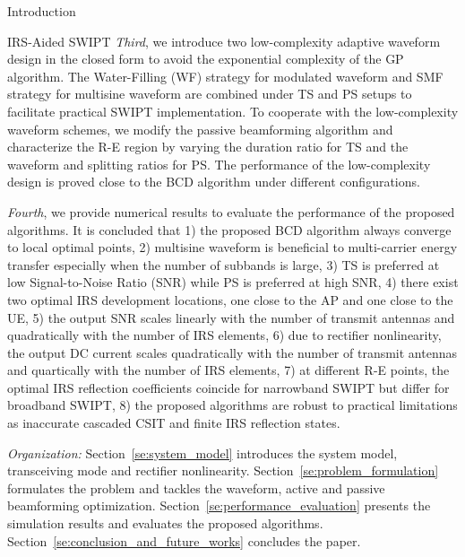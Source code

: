 \documentclass[journal]{IEEEtran}
\begin{document}
\begin{section}{Introduction}
\begin{subsection}{IRS-Aided SWIPT}
			\emph{Third}, we introduce two low-complexity adaptive waveform design in the closed form to avoid the exponential complexity of the GP algorithm. The Water-Filling (WF) strategy for modulated waveform and SMF strategy for multisine waveform are combined under TS and PS setups to facilitate practical SWIPT implementation. To cooperate with the low-complexity waveform schemes, we modify the passive beamforming algorithm and characterize the R-E region by varying the duration ratio for TS and the waveform and splitting ratios for PS. The performance of the low-complexity design is proved close to the BCD algorithm under different configurations.

			\emph{Fourth}, we provide numerical results to evaluate the performance of the proposed algorithms. It is concluded that 1) the proposed BCD algorithm always converge to local optimal points, 2) multisine waveform is beneficial to multi-carrier energy transfer especially when the number of subbands is large, 3) TS is preferred at low Signal-to-Noise Ratio (SNR) while PS is preferred at high SNR, 4) there exist two optimal IRS development locations, one close to the AP and one close to the UE, 5) the output SNR scales linearly with the number of transmit antennas and quadratically with the number of IRS elements, 6) due to rectifier nonlinearity, the output DC current scales quadratically with the number of transmit antennas and quartically with the number of IRS elements, 7) at different R-E points, the optimal IRS reflection coefficients coincide for narrowband SWIPT but differ for broadband SWIPT, 8) the proposed algorithms are robust to practical limitations as inaccurate cascaded CSIT and finite IRS reflection states.

			\emph{Organization:} Section~\ref{se:system_model} introduces the system model, transceiving mode and rectifier nonlinearity. Section~\ref{se:problem_formulation} formulates the problem and tackles the waveform, active and passive beamforming optimization. Section~\ref{se:performance_evaluation} presents the simulation results and evaluates the proposed algorithms. Section~\ref{se:conclusion_and_future_works} concludes the paper.


\end{subsection}
\end{section}
\end{document}

